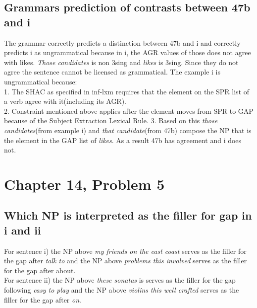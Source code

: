 \documentclass{article}
\begin{document}
\subsection{Grammars prediction of contrasts between 47b and i}
The grammar correctly predicts a distinction between 47b and i and correctly predicts i as ungrammatical because in i, the AGR values of those does not agree with likes. {\it Those candidates} is non 3sing and {\it likes} is 3sing. Since they do not agree the sentence cannot be licensed as grammatical. The example i is ungrammatical because: \\
1. The SHAC as specified in inf-lxm requires that the element on the SPR list of a verb agree with it(including its AGR).\\
2. Constraint mentioned above applies after the element moves from SPR to GAP because of the Subject Extraction Lexical Rule.
3. Based on this {\it those candidates}(from example i) and {\it that candidate}(from 47b) compose the NP that is the element in the GAP list of {\it likes}. As a result 47b has agreement and i does not. 
\section{Chapter 14, Problem 5}
\subsection{Which NP is interpreted as the filler for gap in i and ii}
For sentence i) the NP above {\it my friends on the east coast} serves as the filler for the gap after {\it talk to} and the NP above {\it problems this involved} serves as the filler for the gap after about. \\
For sentence ii) the NP above {\it these sonatas} is serves as the filler for the gap following {\it easy to play} and the NP above {\it violins this well crafted} serves as the filler for the gap after {\it on}.
\end{document}
